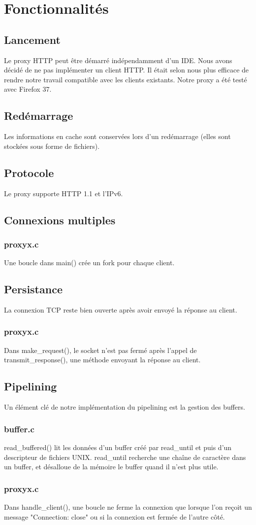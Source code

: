 \section{Fonctionnalités}
\subsection{Lancement}
Le proxy HTTP peut être démarré indépendamment d'un IDE. Nous avons décidé de ne pas implémenter un client HTTP. Il était selon nous plus efficace de rendre notre travail compatible avec les clients existants. Notre proxy a été testé avec Firefox 37. 

\subsection{Redémarrage}
Les informations en cache sont conservées lors d'un redémarrage (elles sont stockées sous forme de fichiers).

\subsection{Protocole}
Le proxy supporte HTTP 1.1 et l'IPv6.

\subsection{Connexions multiples}
\subsubsection{proxyx.c}
Une boucle dans main() crée un fork pour chaque client.

\subsection{Persistance}
La connexion TCP reste bien ouverte après avoir envoyé la réponse au client.
\subsubsection{proxyx.c}
Dans make\_request(), le socket n'est pas fermé après l'appel de transmit\_response(), une méthode envoyant la réponse au client.

\subsection{Pipelining}
Un élément clé de notre implémentation du pipelining est la gestion des buffers.
\subsubsection{buffer.c}
read\_buffered() lit les données d'un buffer créé par read\_until et puis d'un descripteur de fichiers UNIX. read\_until recherche une chaîne de caractère dans un buffer, et désalloue de la mémoire le buffer quand il n'est plus utile.
\subsubsection{proxyx.c}
Dans handle\_client(), une boucle ne ferme la connexion que lorsque l'on reçoit un message "Connection: close" ou si la connexion est fermée de l'autre côté.
